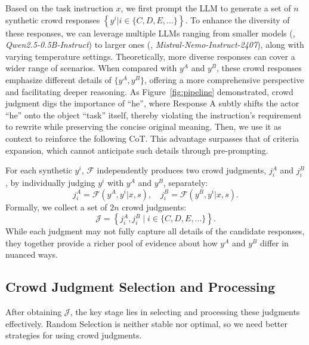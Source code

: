 Based on the task instruction $x$, we first prompt the LLM to generate a set of $n$ synthetic crowd responses $\left\{y^i|i\in\{C,D,E,...\}\right\}$.
To enhance the diversity of these responses, we can leverage multiple LLMs ranging from smaller models (\eg, \textit{Qwen2.5-0.5B-Instruct}) to larger ones (\eg, \textit{Mistral-Nemo-Instruct-2407}), along with varying temperature settings.
Theoretically, more diverse responses can cover a wider range of scenarios. When compared with $y^A$ and $y^B$, these crowd responses emphasize different details of $\{y^A, y^B\}$, offering a more comprehensive perspective and facilitating deeper reasoning. As Figure~\ref{fig:pipeline} demonstrated, crowd judgment digs the importance of ``he'', where Response A subtly shifts the actor ``he'' onto the object ``task'' itself, thereby violating the instruction's requirement to rewrite while preserving the concise original meaning.
Then, we use it as context to reinforce the following CoT. This advantage surpasses that of criteria expansion, which cannot anticipate such details through pre-prompting.

For each synthetic $y^i$, $\mathcal{F}$ independently produces two crowd judgments, $j^A_i$ and $j^B_i$, by individually judging $y^i$ with $y^A$ and $y^B$, separately:
\begin{equation}
    j^A_i = \mathcal{F}(y^A, y^i|x,s), \quad j^B_i = \mathcal{F}(y^B, y^i|x,s).
\end{equation}
Formally, we collect a set of $2n$ crowd judgments:
\begin{equation}
    \mathcal{J} = \left\{ j^A_i, j^B_i \mid i\in\{C,D,E,...\}\right\}.
\end{equation}
While each judgment may not fully capture all details of the candidate responses, they together provide a richer pool of evidence about how $y^A$ and $y^B$ differ in nuanced ways.


\subsection{Crowd Judgment Selection and Processing}
\label{subsec:selection}
After obtaining $\mathcal{J}$, the key stage lies in selecting and processing these judgments effectively. 
Random Selection is neither stable nor optimal, so we need better strategies for using crowd judgments.

